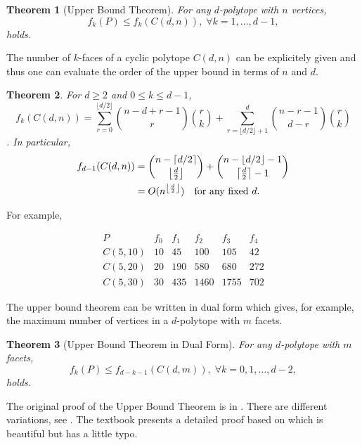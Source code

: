 \documentclass[[a4paper,12pt]{article}
\newtheorem{theorem}{Theorem}
\newcommand{\FL}[1]{\left\lfloor #1  \right\rfloor}
\newcommand{\RF}[1]{\left\lceil #1  \right\rceil}
\begin{document}
\begin{theorem} [Upper Bound Theorem] \label{thm:MUB}
For any $d$-polytope with $n$ vertices,  
\[
  f_k(P)  \le f_{k}(C(d,n)),  \; \forall k=1, \ldots, d-1,
\]
holds.
\end{theorem}

The number of $k$-faces of a cyclic polytope $C(d,n)$ can
be explicitely given and thus one can evaluate the order of
the upper bound in terms of $n$ and $d$.

\begin{theorem} \label{thm:Cyclic}
For $d \ge 2$ and $0 \le k \le d-1$,
\[
 f_{k}(C(d,n)) = \sum_{r=0}^{\lfloor d/2 \rfloor}
\binom{n-d+r-1}{r} \binom{r}{k}
+
\sum_{r=\lfloor d/2 \rfloor+1}^{d}
\binom{n-r-1}{d-r} \binom{r}{k}
\].  In particular,
\begin{align} \label{polytope:FacetUB}
 f_{d-1}(C(d,n))  
  &= \binom{n-\RF{d/2}}{\left\lfloor \frac{d}{2} \right\rfloor} + \binom{n-\FL{d/2}-1}{\left\lceil \frac{d}{2} \right\rceil -1}\\
   & = O(n^{\left\lfloor \frac{d}{2} \right\rfloor}) \text{\quad for any fixed $d$}.
\end{align}
\end{theorem}


\noindent
For example,

\[
\begin{array}{lrrrrr}
P       & f_0 &  f_1 & f_2 &  f_3 & f_4 \\  
C(5,10) &  10  &  45 &   100 &   105  &  42\\
C(5,20) &  20  & 190 &   580 &   680  & 272\\
C(5,30) &  30  & 435 &  1460 &  1755  & 702
\end{array}
\]

The upper bound theorem can be written in dual  form which
gives, for example, the maximum number of vertices in
a $d$-polytope with $m$ facets.

\begin{theorem} [Upper Bound Theorem in Dual Form] \label{thm:MUBDual}
For any $d$-polytope with $m$ facets,  
\[
  f_k(P)  \le f_{d-k-1}(C(d,m)),  \; \forall k=0,1, \ldots, d-2,
\]
holds.
\end{theorem}


The original proof of the Upper Bound Theorem is in
\cite{m-mnfcp-70,ms-cpuc-71}.
There are different variations, 
see \cite{k-lpsasp-97,m-cg-94,z-lop-94}.  The textbook \cite[Chap 6]{f-pc-20} 
presents a detailed proof based on \cite{k-lpsasp-97} which is beautiful 
but has a little typo.
\end{document}
